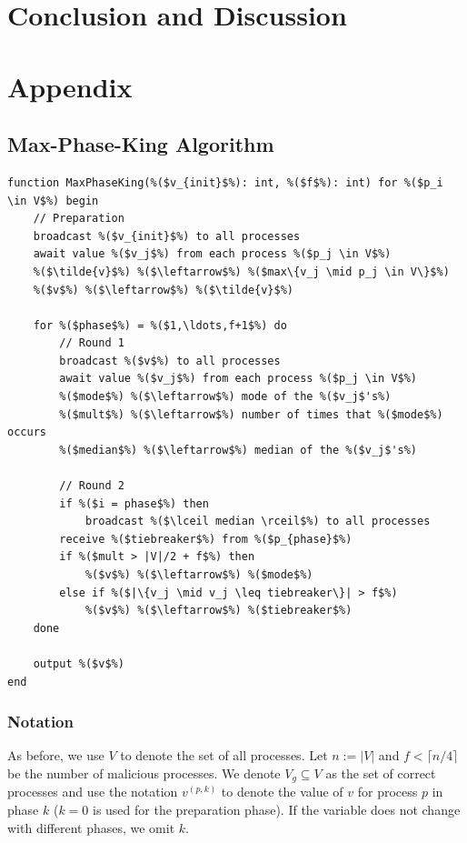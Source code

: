 \documentclass[runningheads]{llncs}
\begin{document}
\section{Conclusion and Discussion} \label{sec:conclusion}

%
%


\newpage 
\appendix
\section{Appendix}\label{appendix}
\subsection{Max-Phase-King Algorithm}\label{appendix:maxphaseking}
\begin{lstlisting}
function MaxPhaseKing(%($v_{init}$%): int, %($f$%): int) for %($p_i \in V$%) begin 
    // Preparation
    broadcast %($v_{init}$%) to all processes
    await value %($v_j$%) from each process %($p_j \in V$%)
    %($\tilde{v}$%) %($\leftarrow$%) %($max\{v_j \mid p_j \in V\}$%)
    %($v$%) %($\leftarrow$%) %($\tilde{v}$%)

    for %($phase$%) = %($1,\ldots,f+1$%) do
        // Round 1
        broadcast %($v$%) to all processes
        await value %($v_j$%) from each process %($p_j \in V$%)
        %($mode$%) %($\leftarrow$%) mode of the %($v_j$'s%)
        %($mult$%) %($\leftarrow$%) number of times that %($mode$%) occurs 
        %($median$%) %($\leftarrow$%) median of the %($v_j$'s%)

        // Round 2
        if %($i = phase$%) then 
            broadcast %($\lceil median \rceil$%) to all processes 
        receive %($tiebreaker$%) from %($p_{phase}$%)
        if %($mult > |V|/2 + f$%) then 
            %($v$%) %($\leftarrow$%) %($mode$%)
        else if %($|\{v_j \mid v_j \leq tiebreaker\}| > f$%)
            %($v$%) %($\leftarrow$%) %($tiebreaker$%)
    done

    output %($v$%)
end
\end{lstlisting}

\subsubsection{Notation} As before, we use $V$ to denote the set of all processes. Let $n := |V|$ and $f < \lceil n/4 \rceil$ be the number of malicious processes. We denote $V_g \subseteq V$ as the set of correct processes and use the notation $v^{(p, k)}$ to denote the value of $v$ for process $p$ in phase $k$ ($k=0$ is used for the preparation phase). If the variable does not change with different phases, we omit $k$.
\end{document}
